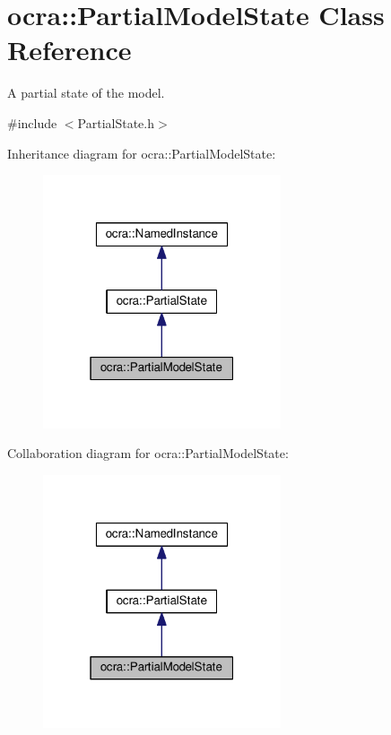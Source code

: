 \hypertarget{classocra_1_1PartialModelState}{}\section{ocra\+:\+:Partial\+Model\+State Class Reference}
\label{classocra_1_1PartialModelState}


A partial state of the model.  




{\ttfamily \#include $<$Partial\+State.\+h$>$}



Inheritance diagram for ocra\+:\+:Partial\+Model\+State\+:
\nopagebreak
\begin{figure}[H]
\begin{center}
\leavevmode
\includegraphics[width=199pt]{db/dff/classocra_1_1PartialModelState__inherit__graph}
\end{center}
\end{figure}


Collaboration diagram for ocra\+:\+:Partial\+Model\+State\+:
\nopagebreak
\begin{figure}[H]
\begin{center}
\leavevmode
\includegraphics[width=199pt]{d8/d23/classocra_1_1PartialModelState__coll__graph}
\end{center}
\end{figure}
